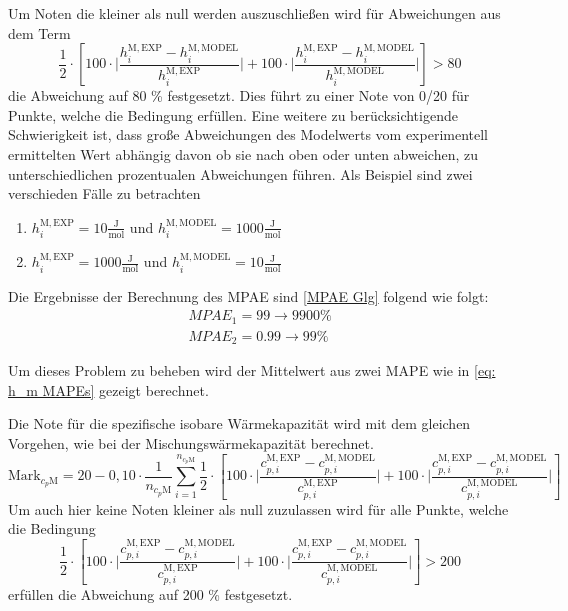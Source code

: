 \documentclass[../thesis.tex]{subfiles}
\begin{document}
Um Noten die kleiner als null werden auszuschließen wird für Abweichungen aus dem Term
\begin{equation}
	\label{eq: h_m MAPEs}
	\dfrac{1}{2} \cdot \left[
	100 \cdot \biggl|
	\dfrac{h_i^{\mathrm{M,EXP}}-h_i^{\mathrm{M,MODEL}}}{h_i^{\mathrm{M,EXP}}} 
	\biggl| 
	+ 100 \cdot \biggl| \dfrac{h_i^{\mathrm{M,EXP}}-h_i^{\mathrm{M,MODEL}}}{h_i^{\mathrm{M,MODEL}}}
	\biggl| \right] > 80
\end{equation}
die Abweichung auf 80 \% festgesetzt. Dies führt zu einer Note von 0/20 für Punkte, welche die Bedingung erfüllen. Eine weitere zu berücksichtigende Schwierigkeit ist, dass große Abweichungen des Modelwerts vom experimentell ermittelten Wert abhängig davon ob sie nach oben oder unten abweichen, zu unterschiedlichen prozentualen Abweichungen führen.
Als Beispiel sind zwei verschieden Fälle zu betrachten
\begin{enumerate}
	\item $ h_i^{\mathrm{M,EXP}} = 10 \mathrm{\frac{J}{mol}} $ und $ h_i^{\mathrm{M,MODEL}} = 1000 \mathrm{\frac{J}{mol}} $
	\item $ h_i^{\mathrm{M,EXP}} = 1000 \mathrm{\frac{J}{mol}} $ und $ h_i^{\mathrm{M,MODEL}} = 10 \mathrm{\frac{J}{mol}} $
\end{enumerate}
Die Ergebnisse der Berechnung des MPAE sind \autoref{MPAE Glg} folgend wie folgt:
\begin{eqnarray}
MPAE_1 = 99 \rightarrow 9900 \% \\
MPAE_2 = 0.99 \rightarrow 99 \%
\end{eqnarray}

Um dieses Problem zu beheben wird der Mittelwert aus zwei MAPE wie in \autoref{eq: h_m MAPEs} gezeigt berechnet.

Die Note für die spezifische isobare Wärmekapazität wird mit dem gleichen Vorgehen, wie bei der Mischungswärmekapazität berechnet.
\begin{equation}
\mathrm{Mark}_{c_p{\mathrm{M}}} = 20 - 0,10 \cdot \dfrac{1}{n_{c_p{\mathrm{M}}}} \sum_{i=1}^{n_{c_p{\mathrm{M}}}}
\dfrac{1}{2} \cdot \left[
100 \cdot \biggl|
\dfrac{c_{p,i}^{\mathrm{M,EXP}}-c_{p,i}^{\mathrm{M,MODEL}}}{c_{p,i}^{\mathrm{M,EXP}}} 
\biggl| 
+ 100 \cdot \biggl| \dfrac{c_{p,i}^{\mathrm{M,EXP}}-c_{p,i}^{\mathrm{M,MODEL}}}{c_{p,i}^{\mathrm{M,MODEL}}}
\biggl|
\right]
\end{equation}
Um auch hier keine Noten kleiner als null zuzulassen wird für alle Punkte, welche die Bedingung 
\begin{equation}
\dfrac{1}{2} \cdot \left[
100 \cdot \biggl|
\dfrac{c_{p,i}^{\mathrm{M,EXP}}-c_{p,i}^{\mathrm{M,MODEL}}}{c_{p,i}^{\mathrm{M,EXP}}} 
\biggl| 
+ 100 \cdot \biggl| \dfrac{c_{p,i}^{\mathrm{M,EXP}}-c_{p,i}^{\mathrm{M,MODEL}}}{c_{p,i}^{\mathrm{M,MODEL}}}
\biggl| \right]> 200
\end{equation}
erfüllen die Abweichung auf 200 \% festgesetzt.
\end{document}
